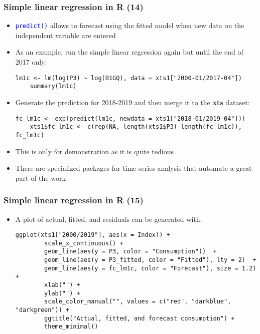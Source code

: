 \documentclass[10pt]{beamer}
\newcommand{\cc}[1]{\texttt{\textcolor{blue}{#1}}}
\theoremstyle{definition}
\begin{document}
\begin{frame}[fragile]
\frametitle{Simple linear regression in R (14)}
\begin{itemize}
	\item \cc{predict()} allows to forecast using the fitted model when new data on the independent variable are entered
	\item As an example, run the simple linear regression again but until the end of 2017 only:
	\begin{lstlisting}[style = rstyle, breaklines]
	lm1c <- lm(log(P3) ~ log(B1GQ), data = xts1["2000-01/2017-04"])
	summary(lm1c)	
	\end{lstlisting}
	
	\item Generate the prediction for 2018-2019 and then merge it to the \textbf{xts} dataset:
	\begin{lstlisting}[style = rstyle, breaklines]
	fc_lm1c <- exp(predict(lm1c, newdata = xts1["2018-01/2019-04"]))
	xts1$fc_lm1c <- c(rep(NA, length(xts1$P3)-length(fc_lm1c)), fc_lm1c)	
	\end{lstlisting}	
	
	\item This is only for demonstration as it is quite tedious
	\item There are specialized packages for time series analysis that automate a great part of the work
\end{itemize}
\end{frame}

\begin{frame}[fragile]
\frametitle{Simple linear regression in R (15)}
\begin{itemize}
	\item A plot of actual, fitted, and residuals can be generated with:
	\begin{lstlisting}[style = rstyle, breaklines]
	ggplot(xts1["2000/2019"], aes(x = Index)) + 
		scale_x_continuous() +
		geom_line(aes(y = P3, color = "Consumption"))  + 
		geom_line(aes(y = P3_fitted, color = "Fitted"), lty = 2)  + 
		geom_line(aes(y = fc_lm1c, color = "Forecast"), size = 1.2)  + 
		xlab("") + 
		ylab("") + 
		scale_color_manual("", values = c("red", "darkblue", "darkgreen")) +
		ggtitle("Actual, fitted, and forecast consumption") + 
		theme_minimal()	
	\end{lstlisting}
\end{itemize}
\end{frame}
\end{document}
